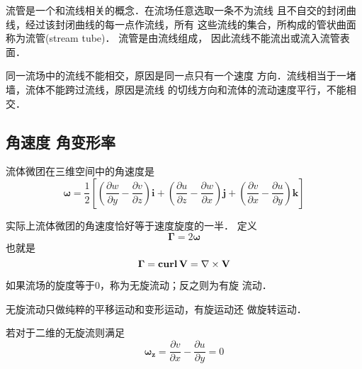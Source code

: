流管是一个和流线相关的概念．在流场任意选取一条不为流线
且不自交的封闭曲线，经过该封闭曲线的每一点作流线，所有
这些流线的集合，所构成的管状曲面称为流管(stream tube)．
流管是由流线组成，
因此流线不能流出或流入流管表面．

\begin{note}
	同一流场中的流线不能相交，原因是同一点只有一个速度
	方向．流线相当于一堵墙，流体不能跨过流线，原因是流线
	的切线方向和流体的流动速度平行，不能相交．
\end{note}

\subsection{角速度\hspace{1em} 角变形率}
流体微团在三维空间中的角速度是
\[
	\mathbf{\omega}=\frac{1}{2 }\left[
		\left( \frac{\partial w}{\partial y}-
		\frac{\partial v}{\partial z}\right)\mathbf{i}
		+\left( \frac{\partial u}{\partial z}-
		\frac{\partial w}{\partial x}\right) \mathbf{j}+
		\left( \frac{\partial v}{\partial x}-
		\frac{\partial u}{\partial y}\right) \mathbf{k}
		\right]
\]

实际上流体微团的角速度恰好等于速度旋度的一半．
定义
\[
	\mathbf{\Gamma} =2\mathbf{\omega}
\]
也就是
\[
	\mathbf{\Gamma} =\mathbf{curl}\, \mathbf{V}=\nabla
	\times \mathbf{V}
\]

如果流场的旋度等于0，称为无旋流动；反之则为有旋
流动．
\begin{note}
	无旋流动只做纯粹的平移运动和变形运动，有旋运动还
	做旋转运动．
\end{note}
若对于二维的无旋流则满足
\[
	\mathbf{\omega_z}= \frac{\partial v}{\partial x}-
	\frac{\partial u}{\partial y}=0
\]

